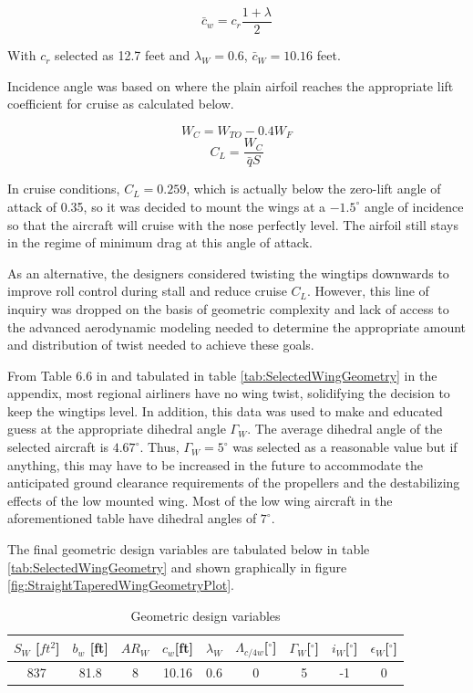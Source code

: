 \documentclass[conf]{new-aiaa}
\begin{document}
\begin{equation}
    \bar{c}_w = c_r \frac{1 + \lambda}{2}
\end{equation}

With $c_r$ selected as 12.7 feet and $\lambda_W = 0.6$, $\bar{c}_W = 10.16$ feet.

Incidence angle was based on where the plain airfoil reaches the appropriate lift coefficient for cruise as calculated below.

\begin{equation}
    W_C = W_{TO} - 0.4 W_F
\end{equation}
\begin{equation}
    C_L = \frac{ W_C }{ \bar{q} S}
\end{equation}

In cruise conditions, $C_L = 0.259$, which is actually below the zero-lift angle of attack of 0.35, so it was decided to mount the wings at a $-1.5 ^\circ$ angle of incidence so that the aircraft will cruise with the nose perfectly level. The airfoil still stays in the regime of minimum drag at this angle of attack.

As an alternative, the designers considered twisting the wingtips downwards to improve roll control during stall and reduce cruise $C_L$. However, this line of inquiry was dropped on the basis of geometric complexity and lack of access to the advanced aerodynamic modeling needed to determine the appropriate amount and distribution of twist needed to achieve these goals.

From Table 6.6 in \cite{WingGeometryGerren} and tabulated in table \ref{tab:SelectedWingGeometry} in the appendix, most regional airliners have no wing twist, solidifying the decision to keep the wingtips level. In addition, this data was used to make and educated guess at the appropriate dihedral angle $\Gamma_W$. The average dihedral angle of the selected aircraft is $4.67 ^\circ$. Thus, $\Gamma_W = 5^\circ$ was selected as a reasonable value but if anything, this may have to be increased in the future to accommodate the anticipated ground clearance requirements of the propellers and the destabilizing effects of the low mounted wing. Most of the low wing aircraft in the aforementioned table have dihedral angles of $7^\circ$.

The final geometric design variables are tabulated below in table \ref{tab:SelectedWingGeometry} and shown graphically in figure \ref{fig:StraightTaperedWingGeometryPlot}.

\begin{table}[H]
\centering
\caption{Geometric design variables}
\label{tab:WingGeometry}
\begin{tabular}{|c|c|c|c|c|c|c|c|c|} \hline
$S_W$ [$ft^2$] & $b_w$ [ft] & $AR_W$ & $c_w$[ft] & $\lambda_W$ & $\Lambda_{c/4w}$[$^\circ$] & $\Gamma_W$[$^\circ$]  & $i_W$[$^\circ$] & $\epsilon_W$[$^\circ$]\\ \hline
837 & 81.8 & 8 & 10.16 & 0.6 & 0 & 5 & -1 & 0\\ \hline
\end{tabular}
\end{table}
\end{document}
